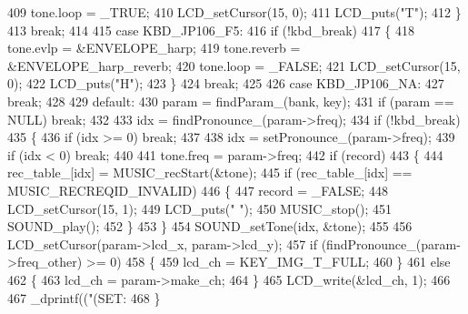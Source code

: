 \begin{DoxyCode}
{409                 tone.loop = \_TRUE;
410                 LCD\_setCursor(15, 0);
411                 LCD\_puts(\textcolor{stringliteral}{"T"});
412             \}
413             \textcolor{keywordflow}{break};
414 
415         \textcolor{keywordflow}{case} KBD\_JP106\_F5:
416             \textcolor{keywordflow}{if} (!kbd\_break)
417             \{
418                 tone.evlp = &ENVELOPE\_harp;
419                 tone.reverb = &ENVELOPE\_harp\_reverb;
420                 tone.loop = \_FALSE;
421                 LCD\_setCursor(15, 0);
422                 LCD\_puts(\textcolor{stringliteral}{"H"});
423             \}
424             \textcolor{keywordflow}{break};
425 
426         \textcolor{keywordflow}{case} KBD\_JP106\_NA:
427             \textcolor{keywordflow}{break};
428 
429         \textcolor{keywordflow}{default}:
430             param = findParam\_(bank, key);
431             \textcolor{keywordflow}{if} (param == NULL) \textcolor{keywordflow}{break};
432 
433             idx = findPronounce\_(param->freq);
434             \textcolor{keywordflow}{if} (!kbd\_break)
435             \{
436                 \textcolor{keywordflow}{if} (idx >= 0) \textcolor{keywordflow}{break};
437 
438                 idx = setPronounce\_(param->freq);
439                 \textcolor{keywordflow}{if} (idx < 0) \textcolor{keywordflow}{break};
440 
441                 tone.freq = param->freq;
442                 \textcolor{keywordflow}{if} (record)
443                 \{
444                     rec\_table\_[idx] = MUSIC\_recStart(&tone);
445                     \textcolor{keywordflow}{if} (rec\_table\_[idx] == MUSIC\_RECREQID\_INVALID)
446                     \{
447                         record = \_FALSE;
448                         LCD\_setCursor(15, 1);
449                         LCD\_puts(\textcolor{stringliteral}{" "});
450                         MUSIC\_stop();
451                         SOUND\_play();
452                     \}
453                 \}
454                 SOUND\_setTone(idx, &tone);
455 
456                 LCD\_setCursor(param->lcd_x, param->lcd_y);
457                 \textcolor{keywordflow}{if} (findPronounce\_(param->freq_other) >= 0)
458                 \{
459                     lcd\_ch = KEY_IMG_T_FULL;
460                 \}
461                 \textcolor{keywordflow}{else}
462                 \{
463                     lcd\_ch = param->make_ch;
464                 \}
465                 LCD\_write(&lcd\_ch, 1);
466 
467                 \_dprintf((\textcolor{stringliteral}{"(SET:%
468             \}
}}
\end{DoxyCode}

